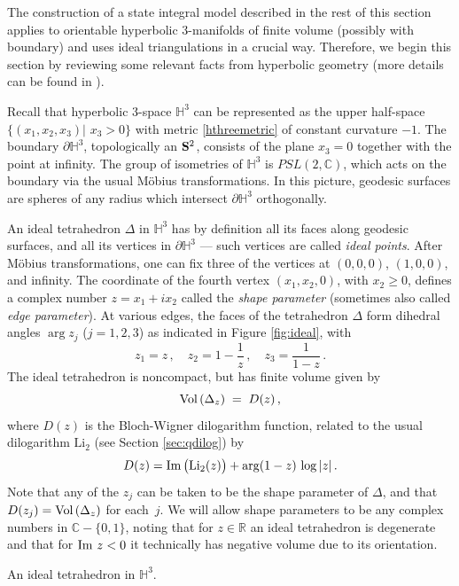 \documentclass[hyper]{JHEP3}
\renewcommand{\Im}{{\rm Im}\,}
\newcommand{\C}{{\mathbb{C}}}
\newcommand{\R}{{\mathbb{R}}}
\newcommand{\IH}{{\mathbb{H}}}
\newcommand\be{\begin{equation}}
\newcommand\ee{\end{equation}}
\newcommand{\Vol}{{\mbox{Vol\,}}}
\def\={\;=\;}
\def\Li{\text{Li}_2}
\begin{document}
The construction of a state integral model described in the rest of this section
applies to orientable hyperbolic 3-manifolds of finite volume (possibly with boundary)
and uses ideal triangulations in a crucial way.
Therefore, we begin this section by reviewing some relevant facts from hyperbolic geometry
(more details can be found in \cite{thurston-1980, thurston-1982,
thurston-1999}).

Recall that hyperbolic 3-space $\IH^3$ can be represented as the upper half-space
$\{(x_1,x_2,x_3) \vert$ $x_3>0 \}$ with metric \eqref{hthreemetric} of constant curvature $-1$.
The boundary $\partial \IH^3$, topologically an ${\bf S}^2$,
consists of the plane $x_3=0$ together with the point at infinity.
The group of isometries of $\IH^3$ is $PSL(2,\C)$,
which acts on the boundary via the usual M\"obius transformations.
In this picture, geodesic surfaces are spheres of any radius which intersect $\partial \IH^3$ orthogonally.

An ideal tetrahedron $\Delta$ in $\IH^3$ has by definition all its faces along geodesic surfaces,
and all its vertices in $\partial \IH^3$ --- such vertices are called {\it ideal points}.
After M\"obius transformations, one can fix three of the vertices at $(0,0,0)$,
$(1,0,0)$, and infinity.
The coordinate of the fourth vertex $(x_1,x_2,0)$, with $x_2\geq 0$,
defines a complex number $z=x_1 + i x_2$ called the {\it shape parameter}
(sometimes also called {\it edge parameter}).
At various edges, the faces of the tetrahedron $\Delta$ form dihedral angles
$\arg z_j$ ($j=1,2,3$) as indicated in Figure \ref{fig:ideal}, with
%
\be z_1 = z\,, \quad z_2 = 1-\frac{1}{z}\,, \quad z_3 = \frac{1}{1-z}\,.  \label{zj} \ee
%
The ideal tetrahedron is noncompact, but has finite volume given by
  \be \label{volviad} \Vol (\Delta_z) \= D(z)\,,  \ee
where $D(z)$ is the Bloch-Wigner dilogarithm function, related to the usual dilogarithm $\Li$ (see Section \ref{sec:qdilog}) by
  \be\label{BW} D(z) = \Im\bigl(\Li (z)\bigr) + \arg(1-z)\,\log |z|\,. \ee
Note that any of the $z_j$ can be taken to be the shape parameter of $\Delta$,
and that $D(z_j) = \Vol (\Delta_z)$ for each~$j$.
We will allow shape parameters to be any complex numbers in $\C-\{0,1\}$,
noting that for $z\in\R$ an ideal tetrahedron is degenerate and that for
$\Im\,z<0$ it technically has negative volume due to its orientation.



%
{An ideal tetrahedron in $\IH^3$.
\label{fig:ideal} }
\end{document}
